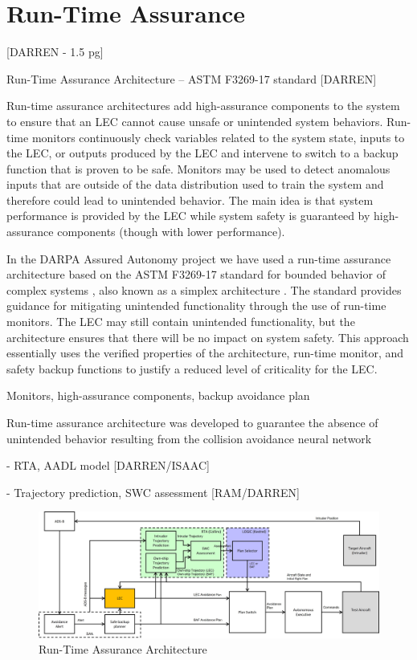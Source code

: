 \section{Run-Time Assurance}

[DARREN - 1.5 pg]

Run-Time Assurance Architecture -- ASTM F3269-17 standard [DARREN]

Run-time assurance architectures add high-assurance components
to the system to ensure that an LEC cannot cause
unsafe or unintended system behaviors. Run-time monitors
continuously check variables related to the system state, inputs
to the LEC, or outputs produced by the LEC and intervene to
switch to a backup function that is proven to be safe. Monitors
may be used to detect anomalous inputs that are outside of the
data distribution used to train the system and therefore could
lead to unintended behavior. The main idea is that system
performance is provided by the LEC while system safety is
guaranteed by high-assurance components (though with lower
performance).

In the DARPA Assured Autonomy project we have used a
run-time assurance architecture based on the ASTM F3269-17
standard for bounded behavior of complex systems \cite{astm-f3269}, also
known as a simplex architecture \cite{simplex}. The standard provides
guidance for mitigating unintended functionality through the
use of run-time monitors. The LEC may still contain unintended
functionality, but the architecture ensures that there will
be no impact on system safety. This approach essentially uses
the verified properties of the architecture, run-time monitor,
and safety backup functions to justify a reduced level of
criticality for the LEC.

Monitors, high-assurance components, backup avoidance plan

Run-time assurance architecture was developed to guarantee the absence of unintended behavior resulting from the collision avoidance neural network

- RTA, AADL model [DARREN/ISAAC]

- Trajectory prediction, SWC assessment [RAM/DARREN]


\begin{figure}
	\centering
	\includegraphics[width=\textwidth]{figures/rta-arch.jpg}
	\caption{Run-Time Assurance Architecture}
	\label{fig:rta-arch}
\end{figure}

